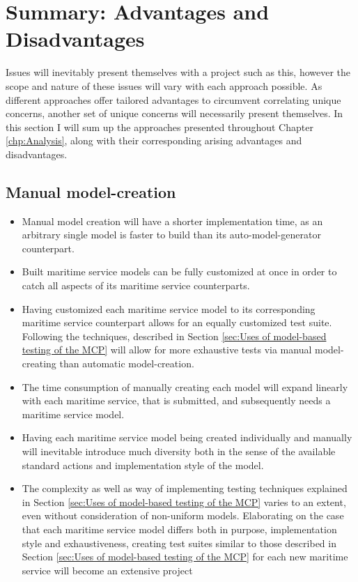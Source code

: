 \section{Summary: Advantages and Disadvantages} 

Issues will inevitably present themselves with a project such as this, however the scope and nature of these issues will vary with each approach possible. As different approaches offer tailored advantages to circumvent correlating unique concerns, another set of unique concerns will necessarily present themselves. In this section I will sum up the approaches presented throughout Chapter \ref{chp:Analysis}, along with their corresponding arising advantages and disadvantages.
\subsection{Manual model-creation}
\begin{itemize}
	\item Manual model creation will have a shorter implementation time, as an arbitrary single model is faster to build than its auto-model-generator counterpart. 
	\item Built maritime service models can be fully customized at once in order to catch all aspects of its maritime service counterparts.
	\item Having customized each maritime service model to its corresponding maritime service counterpart allows for an equally customized test suite. Following the techniques, described in Section \ref{sec:Uses of model-based testing of the MCP} will allow for more exhaustive tests via manual model-creating than automatic model-creation.
\end{itemize}
\begin{itemize}
	\item The time consumption of manually creating each model will expand linearly with each maritime service, that is submitted, and subsequently needs a maritime service model. 
	\item Having each maritime service model being created individually and manually will inevitable introduce much diversity both in the sense of the available standard actions and implementation style of the model.
	\item The complexity as well as way of implementing testing techniques explained in Section \ref{sec:Uses of model-based testing of the MCP} varies to an extent, even without consideration of non-uniform models. Elaborating on the case that each maritime service model differs both in purpose, implementation style and exhaustiveness, creating test suites similar to those described in Section \ref{sec:Uses of model-based testing of the MCP} for each new maritime service will become an extensive project
\end{itemize}
